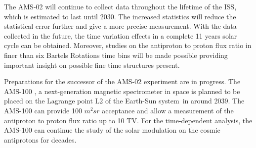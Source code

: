 The AMS-02 will continue to collect data throughout the lifetime of the ISS, which is estimated to last until 2030. The increased statistics will reduce the statistical error further and give a more precise measurement. With the data collected in the future, the time variation effects in a complete 11 years solar cycle can be obtained. Moreover, studies on the antiproton to proton flux ratio in finer than six Bartels Rotations time bins will be made possible providing important insight on possible fine time structures present. \par

   
Preparations for the successor of the AMS-02 experiment are in progress. The AMS-100 \cite{AMS100}, a next-generation magnetic spectrometer in space is planned to be placed on the Lagrange point L2 of the Earth-Sun system in around 2039. The AMS-100 can provide 100 $m^2 sr$ acceptance and allow a measurement of the antiproton to proton flux ratio up to 10 TV. For the time-dependent analysis, the AMS-100 can continue the study of the solar modulation on the cosmic antiprotons for decades. 



